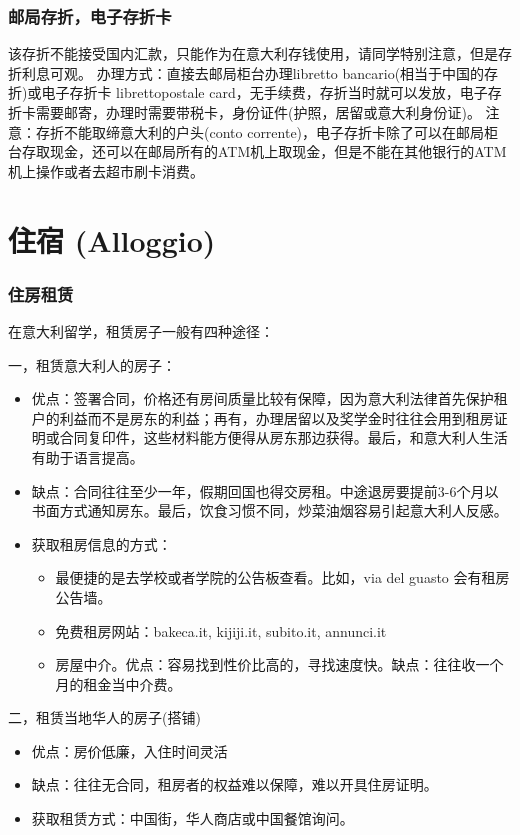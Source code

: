 \subsubsection{邮局存折，电子存折卡}

该存折不能接受国内汇款，只能作为在意大利存钱使用，请同学特别注意，但是存折利息可观。
办理方式：直接去邮局柜台办理libretto bancario(相当于中国的存折)或电子存折卡 librettopostale card，无手续费，存折当时就可以发放，电子存折卡需要邮寄，办理时需要带税卡，身份证件(护照，居留或意大利身份证)。
注意：存折不能取缔意大利的户头(conto corrente)，电子存折卡除了可以在邮局柜台存取现金，还可以在邮局所有的ATM机上取现金，但是不能在其他银行的ATM机上操作或者去超市刷卡消费。

\section{住宿 (Alloggio)}
\subsubsection{住房租赁}

在意大利留学，租赁房子一般有四种途径：

一，租赁意大利人的房子：
\begin{itemize} 
\item 优点：签署合同，价格还有房间质量比较有保障，因为意大利法律首先保护租户的利益而不是房东的利益；再有，办理居留以及奖学金时往往会用到租房证明或合同复印件，这些材料能方便得从房东那边获得。最后，和意大利人生活有助于语言提高。
\item 缺点：合同往往至少一年，假期回国也得交房租。中途退房要提前3-6个月以书面方式通知房东。最后，饮食习惯不同，炒菜油烟容易引起意大利人反感。
\item 获取租房信息的方式：
\begin{itemize}
	\item 最便捷的是去学校或者学院的公告板查看。比如，via del guasto 会有租房公告墙。
	\item 免费租房网站：bakeca.it, kijiji.it,  subito.it, annunci.it
	\item 房屋中介。优点：容易找到性价比高的，寻找速度快。缺点：往往收一个月的租金当中介费。
\end{itemize} 
\end{itemize} 

二，租赁当地华人的房子(搭铺)
\begin{itemize}
\item 优点：房价低廉，入住时间灵活
\item 缺点：往往无合同，租房者的权益难以保障，难以开具住房证明。
\item 获取租赁方式：中国街，华人商店或中国餐馆询问。
\end{itemize} 

